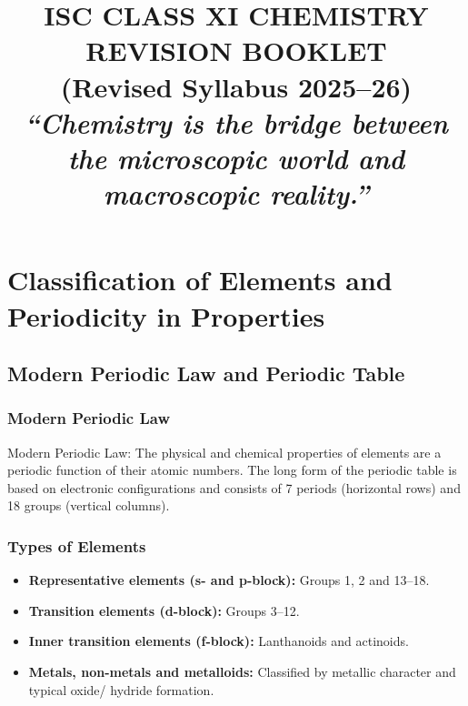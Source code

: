 \documentclass[12pt,a4paper]{article}
\title{\vspace*{3cm}\textbf{ISC CLASS XI CHEMISTRY REVISION BOOKLET}\\[0.5cm]
\large (Revised Syllabus 2025--26)\\[4cm]
\large \emph{``Chemistry is the bridge between the microscopic world and macroscopic reality.''}\\[6cm]}
\author{\studentname}
\date{}
\begin{document}
\setcounter{page}{1}
\maketitle
\thispagestyle{empty}
\clearpage

\thispagestyle{empty}
\mbox{}
\clearpage

\setcounter{page}{3}

\tableofcontents
\clearpage


\section{Classification of Elements and Periodicity in Properties}

\subsection{Modern Periodic Law and Periodic Table}

\subsubsection{Modern Periodic Law}
Modern Periodic Law: The physical and chemical properties of elements are a periodic function of their atomic numbers.  
The long form of the periodic table is based on electronic configurations and consists of 7 periods (horizontal rows) and 18 groups (vertical columns).

\subsubsection{Types of Elements}
\begin{itemize}
    \item \textbf{Representative elements (s- and p-block):} Groups 1, 2 and 13--18.
    \item \textbf{Transition elements (d-block):} Groups 3--12.
    \item \textbf{Inner transition elements (f-block):} Lanthanoids and actinoids.
    \item \textbf{Metals, non-metals and metalloids:} Classified by metallic character and typical oxide/ hydride formation.
\end{itemize}
\end{document}
